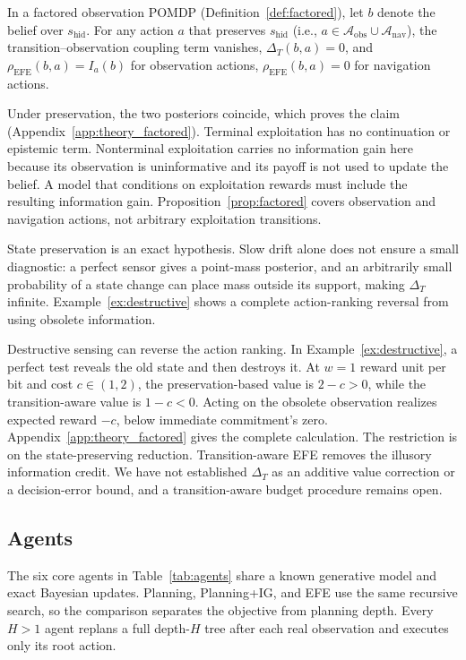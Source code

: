 \documentclass[runningheads]{llncs}
\begin{document}
\begin{proposition}
\label{prop:factored}
In a factored observation POMDP (Definition~\ref{def:factored}), let $b$ denote the belief over $s_{\mathrm{hid}}$. For any action $a$ that preserves $s_{\mathrm{hid}}$ (i.e., $a \in \mathcal{A}_{\mathrm{obs}} \cup \mathcal{A}_{\mathrm{nav}}$), the transition--observation coupling term vanishes, $\Delta_T(b, a) = 0$, and $\rho_{\mathrm{EFE}}(b, a) = I_a(b)$ for observation actions, $\rho_{\mathrm{EFE}}(b, a) = 0$ for navigation actions.
\end{proposition}

Under preservation, the two posteriors coincide, which proves the claim (Appendix~\ref{app:theory_factored}). Terminal exploitation has no continuation or epistemic term. Nonterminal exploitation carries no information gain here because its observation is uninformative and its payoff is not used to update the belief. A model that conditions on exploitation rewards must include the resulting information gain. Proposition~\ref{prop:factored} covers observation and navigation actions, not arbitrary exploitation transitions.

State preservation is an exact hypothesis. Slow drift alone does not ensure a small diagnostic: a perfect sensor gives a point-mass posterior, and an arbitrarily small probability of a state change can place mass outside its support, making $\Delta_T$ infinite. Example~\ref{ex:destructive} shows a complete action-ranking reversal from using obsolete information.

Destructive sensing can reverse the action ranking. In Example~\ref{ex:destructive}, a perfect test reveals the old state and then destroys it. At $w=1$ reward unit per bit and cost $c\in(1,2)$, the preservation-based value is $2-c>0$, while the transition-aware value is $1-c<0$. Acting on the obsolete observation realizes expected reward $-c$, below immediate commitment's zero. Appendix~\ref{app:theory_factored} gives the complete calculation. The restriction is on the state-preserving reduction. Transition-aware EFE removes the illusory information credit. We have not established $\Delta_T$ as an additive value correction or a decision-error bound, and a transition-aware budget procedure remains open.

\subsection{Agents}
\label{sec:agents}

The six core agents in Table~\ref{tab:agents} share a known generative model and exact Bayesian updates. Planning, Planning+IG, and EFE use the same recursive search, so the comparison separates the objective from planning depth. Every $H>1$ agent replans a full depth-$H$ tree after each real observation and executes only its root action.
\end{document}
